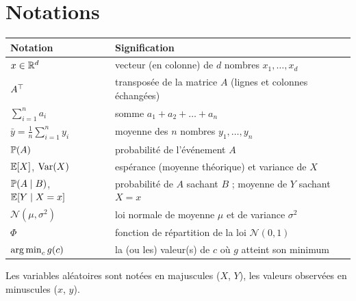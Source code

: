 \section*{Notations}

\begin{center}
\renewcommand{\arraystretch}{1.25}
\begin{tabular}{>{\raggedright}p{} p{}}
\toprule
\textbf{Notation} & \textbf{Signification} \\
\midrule
$x\in\R^d$ & vecteur (en colonne) de $d$ nombres $x_1,\dots,x_d$ \\
$A\T$ & transposée de la matrice $A$ (lignes et colonnes échangées) \\
$\sum_{i=1}^n a_i$ & somme $a_1+a_2+\dots+a_n$ \\
$\bar y=\frac1n\sum_{i=1}^ny_i$ & moyenne des $n$ nombres $y_1,\dots,y_n$ \\
$\P(A)$ & probabilité de l'événement $A$ \\
$\E[X]$, $\Var(X)$ & espérance (moyenne théorique) et variance de $X$ \\
$\P(A\mid B)$, $\E[Y\mid X=x]$ & probabilité de $A$ sachant $B$ ; moyenne de $Y$ sachant $X=x$ \\
$\mathcal N(\mu,\sigma^2)$ & loi normale de moyenne $\mu$ et de variance $\sigma^2$ \\
$\Phi$ & fonction de répartition de la loi $\mathcal N(0,1)$ \\
$\argmin_c g(c)$ & la (ou les) valeur(s) de $c$ où $g$ atteint son minimum \\
\bottomrule
\end{tabular}
\end{center}

Les variables aléatoires sont notées en majuscules ($X$, $Y$), les valeurs observées en minuscules ($x$, $y$).
